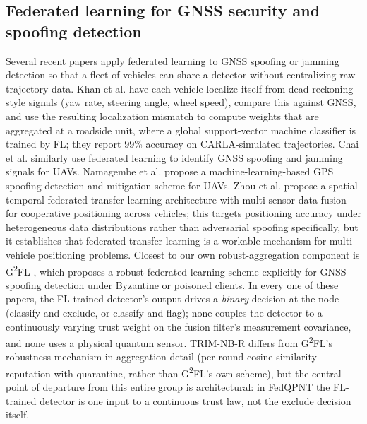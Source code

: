 \documentclass[journal]{IEEEtran}
\begin{document}
\subsection{Federated learning for GNSS security and spoofing detection}
Several recent papers apply federated learning to GNSS spoofing or jamming detection so that a fleet of
vehicles can share a detector without centralizing raw trajectory data. Khan et al.
\cite{khan2025enhancing} have each vehicle localize itself from dead-reckoning-style signals (yaw
rate, steering angle, wheel speed), compare this against GNSS, and use the resulting localization
mismatch to compute weights that are aggregated at a roadside unit, where a global support-vector
machine classifier is trained by FL; they report 99\% accuracy on CARLA-simulated trajectories. Chai et
al. \cite{chai2025navigation} similarly use federated learning to identify GNSS spoofing and jamming
signals for UAVs. Namagembe et al. \cite{namagembe2026machine} propose a machine-learning-based GPS
spoofing detection and mitigation scheme for UAVs. Zhou et al. \cite{zhou2023spatiotemporal} propose a
spatial-temporal federated transfer learning architecture with multi-sensor data fusion for cooperative
positioning across vehicles; this targets positioning accuracy under heterogeneous data distributions
rather than adversarial spoofing specifically, but it establishes that federated transfer learning is a
workable mechanism for multi-vehicle positioning problems. Closest to our own robust-aggregation
component is G\textsuperscript{2}FL \cite{liu2026g2fl}, which proposes a robust federated learning
scheme explicitly for GNSS spoofing detection under Byzantine or poisoned clients. In every one of these
papers, the FL-trained detector's output drives a \emph{binary} decision at the node
(classify-and-exclude, or classify-and-flag); none couples the detector to a continuously varying
trust weight on the fusion filter's measurement covariance, and none uses a physical quantum sensor.
TRIM-NB-R differs from G\textsuperscript{2}FL's robustness mechanism in aggregation detail (per-round
cosine-similarity reputation with quarantine, rather than G\textsuperscript{2}FL's own scheme), but the
central point of departure from this entire group is architectural: in FedQPNT the FL-trained detector
is one input to a continuous trust law, not the exclude decision itself.
\end{document}
